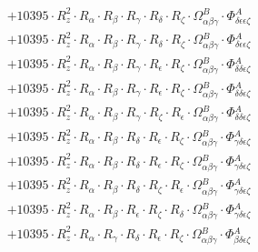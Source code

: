 \documentclass{article}
\begin{document}
\begin{subequations}
\begin{gather}
\begin{array}{c}
 \\[0.2em] 		 + 10395 \cdot R_{z}^{2} \cdot R_{\alpha{}} \cdot R_{\beta{}} \cdot R_{\gamma{}} \cdot R_{\delta{}} \cdot R_{\zeta{}} \cdot \Omega{}^{B}_{\alpha{}\beta{}\gamma{}} \cdot \Phi{}^{A}_{\delta{}\epsilon{}\epsilon{}\zeta{}} 
 \\[0.2em] 		 + 10395 \cdot R_{z}^{2} \cdot R_{\alpha{}} \cdot R_{\beta{}} \cdot R_{\gamma{}} \cdot R_{\delta{}} \cdot R_{\zeta{}} \cdot \Omega{}^{B}_{\alpha{}\beta{}\gamma{}} \cdot \Phi{}^{A}_{\delta{}\epsilon{}\epsilon{}\zeta{}} 
 \\[0.2em] 		 + 10395 \cdot R_{z}^{2} \cdot R_{\alpha{}} \cdot R_{\beta{}} \cdot R_{\gamma{}} \cdot R_{\epsilon{}} \cdot R_{\zeta{}} \cdot \Omega{}^{B}_{\alpha{}\beta{}\gamma{}} \cdot \Phi{}^{A}_{\delta{}\delta{}\epsilon{}\zeta{}} 
 \\[0.2em] 		 + 10395 \cdot R_{z}^{2} \cdot R_{\alpha{}} \cdot R_{\beta{}} \cdot R_{\gamma{}} \cdot R_{\epsilon{}} \cdot R_{\zeta{}} \cdot \Omega{}^{B}_{\alpha{}\beta{}\gamma{}} \cdot \Phi{}^{A}_{\delta{}\delta{}\epsilon{}\zeta{}} 
 \\[0.2em] 		 + 10395 \cdot R_{z}^{2} \cdot R_{\alpha{}} \cdot R_{\beta{}} \cdot R_{\gamma{}} \cdot R_{\zeta{}} \cdot R_{\epsilon{}} \cdot \Omega{}^{B}_{\alpha{}\beta{}\gamma{}} \cdot \Phi{}^{A}_{\delta{}\delta{}\epsilon{}\zeta{}} 
 \\[0.2em] 		 + 10395 \cdot R_{z}^{2} \cdot R_{\alpha{}} \cdot R_{\beta{}} \cdot R_{\delta{}} \cdot R_{\epsilon{}} \cdot R_{\zeta{}} \cdot \Omega{}^{B}_{\alpha{}\beta{}\gamma{}} \cdot \Phi{}^{A}_{\gamma{}\delta{}\epsilon{}\zeta{}} 
 \\[0.2em] 		 + 10395 \cdot R_{z}^{2} \cdot R_{\alpha{}} \cdot R_{\beta{}} \cdot R_{\delta{}} \cdot R_{\epsilon{}} \cdot R_{\zeta{}} \cdot \Omega{}^{B}_{\alpha{}\beta{}\gamma{}} \cdot \Phi{}^{A}_{\gamma{}\delta{}\epsilon{}\zeta{}} 
 \\[0.2em] 		 + 10395 \cdot R_{z}^{2} \cdot R_{\alpha{}} \cdot R_{\beta{}} \cdot R_{\delta{}} \cdot R_{\zeta{}} \cdot R_{\epsilon{}} \cdot \Omega{}^{B}_{\alpha{}\beta{}\gamma{}} \cdot \Phi{}^{A}_{\gamma{}\delta{}\epsilon{}\zeta{}} 
 \\[0.2em] 		 + 10395 \cdot R_{z}^{2} \cdot R_{\alpha{}} \cdot R_{\beta{}} \cdot R_{\epsilon{}} \cdot R_{\zeta{}} \cdot R_{\delta{}} \cdot \Omega{}^{B}_{\alpha{}\beta{}\gamma{}} \cdot \Phi{}^{A}_{\gamma{}\delta{}\epsilon{}\zeta{}} 
 \\[0.2em] 		 + 10395 \cdot R_{z}^{2} \cdot R_{\alpha{}} \cdot R_{\gamma{}} \cdot R_{\delta{}} \cdot R_{\epsilon{}} \cdot R_{\zeta{}} \cdot \Omega{}^{B}_{\alpha{}\beta{}\gamma{}} \cdot \Phi{}^{A}_{\beta{}\delta{}\epsilon{}\zeta{}} 

\end{array}
\end{gather}
\end{subequations}
\end{document}
